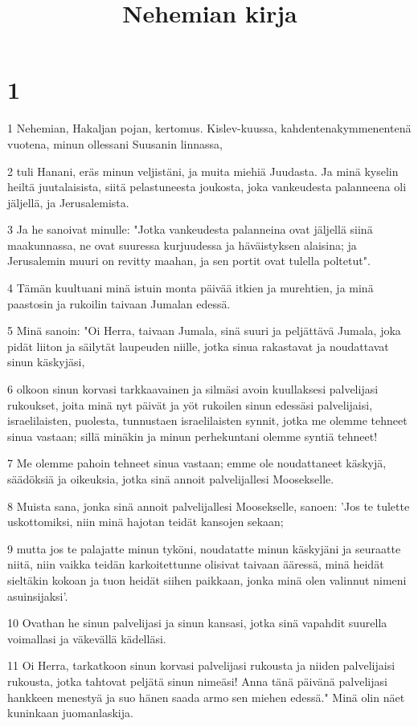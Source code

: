 

\title{Nehemian kirja}


\chapter{1}

\par 1 Nehemian, Hakaljan pojan, kertomus. Kislev-kuussa, kahdentenakymmenentenä vuotena, minun ollessani Suusanin linnassa,
\par 2 tuli Hanani, eräs minun veljistäni, ja muita miehiä Juudasta. Ja minä kyselin heiltä juutalaisista, siitä pelastuneesta joukosta, joka vankeudesta palanneena oli jäljellä, ja Jerusalemista.
\par 3 Ja he sanoivat minulle: "Jotka vankeudesta palanneina ovat jäljellä siinä maakunnassa, ne ovat suuressa kurjuudessa ja häväistyksen alaisina; ja Jerusalemin muuri on revitty maahan, ja sen portit ovat tulella poltetut".
\par 4 Tämän kuultuani minä istuin monta päivää itkien ja murehtien, ja minä paastosin ja rukoilin taivaan Jumalan edessä.
\par 5 Minä sanoin: "Oi Herra, taivaan Jumala, sinä suuri ja peljättävä Jumala, joka pidät liiton ja säilytät laupeuden niille, jotka sinua rakastavat ja noudattavat sinun käskyjäsi,
\par 6 olkoon sinun korvasi tarkkaavainen ja silmäsi avoin kuullaksesi palvelijasi rukoukset, joita minä nyt päivät ja yöt rukoilen sinun edessäsi palvelijaisi, israelilaisten, puolesta, tunnustaen israelilaisten synnit, jotka me olemme tehneet sinua vastaan; sillä minäkin ja minun perhekuntani olemme syntiä tehneet!
\par 7 Me olemme pahoin tehneet sinua vastaan; emme ole noudattaneet käskyjä, säädöksiä ja oikeuksia, jotka sinä annoit palvelijallesi Moosekselle.
\par 8 Muista sana, jonka sinä annoit palvelijallesi Moosekselle, sanoen: 'Jos te tulette uskottomiksi, niin minä hajotan teidät kansojen sekaan;
\par 9 mutta jos te palajatte minun tyköni, noudatatte minun käskyjäni ja seuraatte niitä, niin vaikka teidän karkoitettunne olisivat taivaan ääressä, minä heidät sieltäkin kokoan ja tuon heidät siihen paikkaan, jonka minä olen valinnut nimeni asuinsijaksi'.
\par 10 Ovathan he sinun palvelijasi ja sinun kansasi, jotka sinä vapahdit suurella voimallasi ja väkevällä kädelläsi.
\par 11 Oi Herra, tarkatkoon sinun korvasi palvelijasi rukousta ja niiden palvelijaisi rukousta, jotka tahtovat peljätä sinun nimeäsi! Anna tänä päivänä palvelijasi hankkeen menestyä ja suo hänen saada armo sen miehen edessä." Minä olin näet kuninkaan juomanlaskija.

